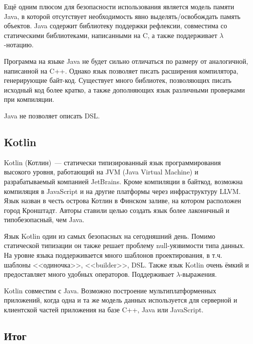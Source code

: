 Ещё одним плюсом для безопасности использования является модель памяти Java, в которой отсутствует необходимость явно выделять/освобождать память объектов. 
Java содержит библиотеку поддержки рефлексии, совместима со статическими библиотеками, написанными на C, а также поддерживает $ \lambda $-нотацию.

Программа на языке Java не будет сильно отличаться по размеру от аналогичной, написанной на C++. 
Однако язык позволяет писать расширения компилятора, генерирующие байт-код. 
Существует много библиотек, позволяющих писать исходный код более кратко, а также дополняющих язык различными проверками при компиляции.

Java не позволяет описать DSL.

\subsection{Kotlin}

Kotlin (Котлин)~--- статически типизированный язык программирования высокого уровня, работающий на JVM (Java Virtual Machine) и разрабатываемый компанией JetBrains. 
Кроме компиляции в байткод, возможна компиляция в JavaScript и на другие платформы через инфраструктуру LLVM. 
Язык назван в честь острова Котлин в Финском заливе, на котором расположен город Кронштадт.
Авторы ставили целью создать язык более лаконичный и типобезопасный, чем Java. 

Язык Kotlin один из самых безопасных на сегодняшний день\cite{vakhitov2016}.
Помимо статической типизации он также решает проблему null-уязвимости типа данных.
На уровне языка поддерживается много шаблонов проектирования, в т.ч. шаблоны <<одиночка>>, <<builder>>, DSL.
Также язык Kotlin очень ёмкий и предоставляет много удобных операторов.
Поддерживает $ \lambda $-выражения.

Kotlin совместим с Java.
Возможно построение мультиплатформенных приложений, когда одна и та же модель данных используется для серверной и клиентской частей приложения на базе C++, Java или JavaScript.

\subsection{Итог}


